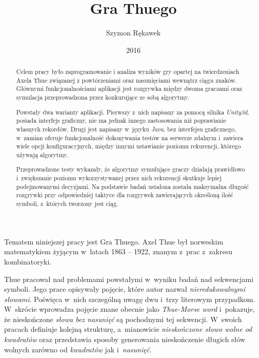 \documentclass[document]{xmgr}
\author   {Szymon Rękawek}
\title    {Gra Thuego}
\date     {2016}
\begin{document}
\begin{abstract}


\nocite{rampersad2007overlap}

Celem pracy było zaprogramowanie i analiza wyników gry opartej na twierdzeniach Axela Thue związanej z powtórzeniami oraz nasunięciami wewnątrz ciągu znaków. Głównymi funkcjonalnościami aplikacji jest rozgrywka między dwoma graczami oraz symulacja przeprowadzona przez konkurujące ze sobą algorytmy. 

Powstały dwa warianty aplikacji. Pierwszy z~nich napisany za pomocą silnika \emph{Unity3d}, posiada interfejs graficzny, nie ma jednak innego zastosowania niż poprawianie własnych rekordów. Drugi jest napisany w~języku \emph{Java}, bez interfejsu graficznego, w~zamian oferuje funkcjonalność dokonywania testów na serwerze zdalnym i~zawiera wiele opcji konfiguracyjnych, między innymi ustawianie poziomu rekurencji, którego używają algorytmy.

Przeprowadzone testy wykazały, że algorytmy symulujące graczy działają prawidłowo i~zwiększanie poziomu wykorzystywanej przez nich rekurencji skutkuje lepiej podejmowanymi decyzjami. Na podstawie badań ustalona została maksymalna długość rozgrywki przy odpowiedniej taktyce dla rozgrywek zawierających określoną ilość symboli, z~których tworzony jest ciąg.
\end{abstract}


\maketitle

\introduction

Tematem niniejszej pracy jest Gra Thuego. Axel Thue był norweskim matematykiem żyjącym w~latach 1863 -- 1922, znanym z~prac z~zakresu kombinatoryki.

Thue pracował nad problemami powstałymi w~wyniku badań nad sekwencjami symboli. Jego prace \cite{repetition} opisywały pojęcie, które autor nazwał \emph{nieredukowalnymi słowami}. Poświęca w~nich szczególną uwagę dwu i~trzy literowym przypadkom. W~skrócie wprowadza pojęcie znane obecnie jako \emph{Thue-Morse word} i~pokazuje, że nieskończone \emph{słowa bez nasunięć} są pochodnymi tej sekwencji. W~swoich pracach definiuje kolejną strukturę, a~mianowicie \emph{nieskończone słowo wolne od kwadratów} oraz przedstawia sposoby generowania nieskończenie długich słów wolnych zarówno od \emph{kwadratów} jak i~\emph{nasunięć}.
\end{document}
